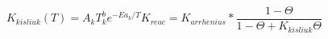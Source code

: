 \documentclass[12pt]{article}
\begin{document}
$$ 
  K_{kisliuk}(T)  =  A_k T^b_k e^{-Ea_k/T }
  K_{reac} = K_{arrhenius} * \frac{1-\Theta}{1-\Theta+K_{kisliuk}\Theta} 
$$
\end{document}
